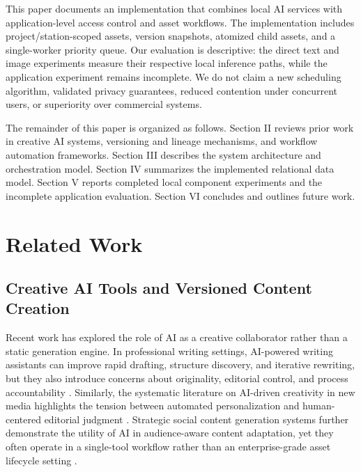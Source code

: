 \documentclass[conference]{IEEEtran}
\begin{document}
This paper documents an implementation that combines local AI services with application-level access control and asset workflows. The implementation includes project/station-scoped assets, version snapshots, atomized child assets, and a single-worker priority queue. Our evaluation is descriptive: the direct text and image experiments measure their respective local inference paths, while the application experiment remains incomplete. We do not claim a new scheduling algorithm, validated privacy guarantees, reduced contention under concurrent users, or superiority over commercial systems.

The remainder of this paper is organized as follows. Section II reviews prior work in creative AI systems, versioning and lineage mechanisms, and workflow automation frameworks. Section III describes the system architecture and orchestration model. Section IV summarizes the implemented relational data model. Section V reports completed local component experiments and the incomplete application evaluation. Section VI concludes and outlines future work.

\section{Related Work}
\subsection{Creative AI Tools and Versioned Content Creation}
Recent work has explored the role of AI as a creative collaborator rather than a static generation engine. In professional writing settings, AI-powered writing assistants can improve rapid drafting, structure discovery, and iterative rewriting, but they also introduce concerns about originality, editorial control, and process accountability \cite{an2022}. Similarly, the systematic literature on AI-driven creativity in new media highlights the tension between automated personalization and human-centered editorial judgment \cite{alhafis2026}. Strategic social content generation systems further demonstrate the utility of AI in audience-aware content adaptation, yet they often operate in a single-tool workflow rather than an enterprise-grade asset lifecycle setting \cite{abbasi2025}.
\end{document}
